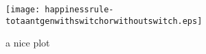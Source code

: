 \documentclass{article}
\begin{document}
\begin{figure}[h]
\centering

\texttt{[image: happinessrule-totaantgenwithswitchorwithoutswitch.eps]}
\caption{a nice plot}
\label{fig:mesh1}
\end{figure}
\end{document}
